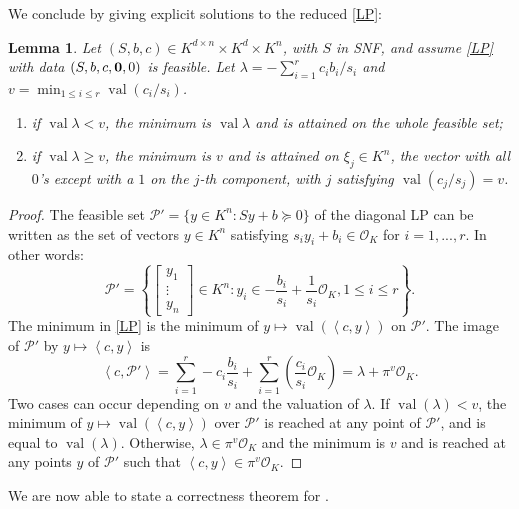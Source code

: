 \documentclass[sigconf]{acmart}
\newcommand{\PP}{\mathcal{P}}
\newtheorem{lemma}[theorem]{Lemma}
\DeclareMathOperator{\val}{val}
\newcommand{\OK}{\mathcal{O}_K}
\begin{document}
We conclude by giving explicit solutions to the reduced \eqref{LP}:

\begin{lemma}\label{solutions}
  Let $(S,b,c) \in K^{d\times n} \times K^d \times K^n$, with $S$ in SNF,
  and assume \eqref{LP} with data $(S,b,c,{\bf 0},0)$ is feasible.
  Let $\lambda = -\sum_{i=1}^r c_i b_i/s_i$ and $v = \min_{1\le i\le r} \val (c_i/s_i)$.
  \begin{enumerate}
  \item
    if $\val \lambda < v$, the minimum is $\val \lambda$ and is attained on the whole feasible
    set; \label{solutions:it1}
  \item
    if $\val \lambda \geq v$, the minimum is $v$ and is attained on
    $\xi_j \in K^n$, the vector with all $0$'s except with a $1$ on the $j$-th component,
    with $j$ satisfying $\val (c_j/s_j) = v$. \label{solutions:it2}
  \end{enumerate}
\end{lemma}
\begin{proof}
  The feasible set $\PP' = \{y \in K^n : Sy+b \succeq 0\}$ of the diagonal LP can be written
  as the set of vectors $y \in K^n$ satisfying $s_i y_i + b_i \in \OK$ for $i=1,...,r$.
  In other words:
  $$
  \PP' = \left\{\left[\begin{smallmatrix} y_1\\ \vdots\\ y_n \end{smallmatrix}\right] \in K^n :
  y_i \in -\frac{b_i}{s_i} + \frac{1}{s_i} \OK, 1\le i\le r\right\}.
  $$
  The minimum in \eqref{LP} is the minimum of
  $y \mapsto \val\left(\left\langle c,y \right\rangle\right)$ on $\PP'$.
  The image of $\PP'$ by $y \mapsto \left\langle c,y \right\rangle$ is
  \[
  \left\langle c,\PP' \right\rangle = \sum_{i=1}^r -c_i \frac{b_i}{s_i} +
  \sum_{i=1}^r\left( \frac{c_i}{s_{i}} \OK \right) = \lambda + \pi^{v} \OK.
  \]
  Two cases can occur depending on $v$ and the valuation of $\lambda$.
  If $\val(\lambda) < v$, the minimum of $y\mapsto \val\left(\left\langle c,y \right\rangle\right)$
  over $\PP'$ is reached at any point of $\PP'$, and is equal to $\val(\lambda)$.
  Otherwise, $\lambda \in \pi^{v} \OK$ and the minimum is $v$ and is reached at any points $y$ of $\PP'$ such that
  $\left\langle c,y \right\rangle \in \pi^v\OK$.
\end{proof}

We are now able to state a correctness theorem for .
  
\end{document}
